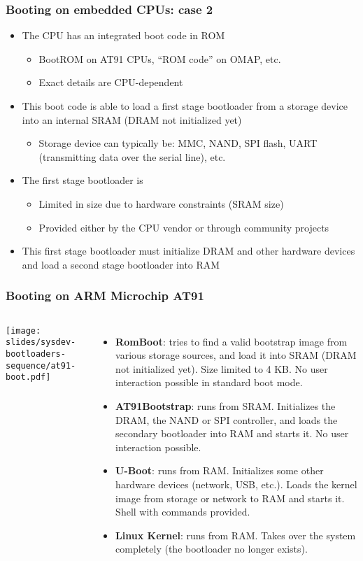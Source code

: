 \begin{frame}
  \frametitle{Booting on embedded CPUs: case 2}
  \begin{itemize}
  \item The CPU has an integrated boot code in ROM
    \begin{itemize}
    \item BootROM on AT91 CPUs, “ROM code” on OMAP, etc.
    \item Exact details are CPU-dependent
    \end{itemize}
  \item This boot code is able to load a first stage bootloader from a
    storage device into an internal SRAM (DRAM not initialized yet)
    \begin{itemize}
    \item Storage device can typically be: MMC, NAND, SPI flash, UART
          (transmitting data over the serial line), etc.
    \end{itemize}
  \item The first stage bootloader is
    \begin{itemize}
    \item Limited in size due to hardware constraints (SRAM size)
    \item Provided either by the CPU vendor or through community projects
    \end{itemize}
  \item This first stage bootloader must initialize DRAM and other
    hardware devices and load a second stage bootloader into RAM
  \end{itemize}
\end{frame}

\begin{frame}
  \frametitle{Booting on ARM Microchip AT91}
  \begin{columns}
    \texttt{[image: slides/sysdev-bootloaders-sequence/at91-boot.pdf]}
    \footnotesize
    \begin{itemize}
    \item {\bf RomBoot}: tries to find a valid bootstrap image from
      various storage sources, and load it into SRAM (DRAM not
      initialized yet). Size limited to 4 KB. No user interaction
      possible in standard boot mode.
    \item {\bf AT91Bootstrap}: runs from SRAM. Initializes the DRAM,
      the NAND or SPI controller, and loads the secondary bootloader
      into RAM and starts it. No user interaction possible.
    \item {\bf U-Boot}: runs from RAM. Initializes some other hardware
      devices (network, USB, etc.).  Loads the kernel image from
      storage or network to RAM and starts it. Shell with commands
      provided.
    \item {\bf Linux Kernel}: runs from RAM. Takes over the system
      completely (the bootloader no longer exists).
    \end{itemize}
  \end{columns}
\end{frame}


